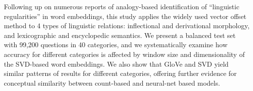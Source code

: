 Following up on numerous reports of analogy-based identification of ``linguistic regularities'' in word embeddings, this study applies the widely used vector offset method to 4 types of linguistic relations: inflectional and derivational morphology, and lexicographic and encyclopedic semantics. We present a balanced test set with 99,200 questions in 40 categories, and we systematically examine how accuracy for different categories is affected by window size and dimensionality of the SVD-based word embeddings. We also show that GloVe and SVD yield similar patterns of results for different categories, offering further evidence for conceptual similarity between count-based and neural-net based models.
